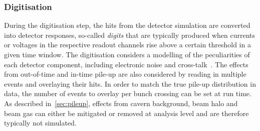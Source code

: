 \subsubsection{Digitisation}

During the digitisation step, the hits from the detector simulation are converted into detector responses, so-called \textit{digits} that are typically produced when currents or voltages in the respective readout channels rise above a certain threshold in a given time window. The digitisation considers a modelling of the peculiarities of each detector component, including electronic noise and cross-talk~\cite{Aad:2010ah}. The effects from out-of-time and in-time pile-up are also considered by reading in multiple events and overlaying their hits. In order to match the true pile-up distribution in data, the number of events to overlay per bunch crossing can be set at run time. As described in~\cref{sec:pileup}, effects from cavern background, beam halo and beam gas can either be mitigated or removed at analysis level and are therefore typically not simulated.








































 